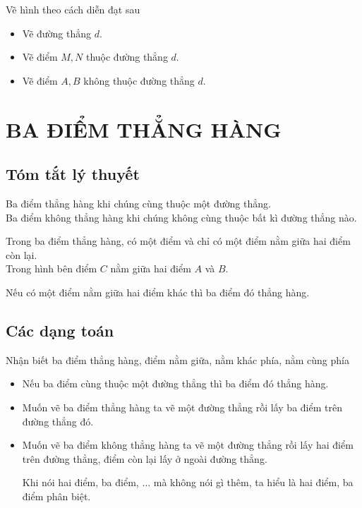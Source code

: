 \begin{bt}%
Vẽ hình theo cách diễn đạt sau
\begin{itemize}
\item Vẽ đường thẳng $d.$
\item Vẽ điểm $M, N$ thuộc đường thẳng $d.$
\item Vẽ  điểm $A, B$ không thuộc đường thẳng $d.$
\end{itemize}
\end{bt}

\section{BA ĐIỂM THẲNG HÀNG}
\subsection{Tóm tắt lý thuyết}
\begin{dn}
Ba điểm thẳng hàng khi chúng cùng thuộc một đường thẳng.\\
Ba điểm không thẳng hàng khi chúng không cùng thuộc bất kì đường thẳng nào.
\end{dn}
\begin{dl}
Trong ba điểm thẳng hàng, có một điểm và chỉ có một điểm nằm giữa hai điểm còn lại.\\
Trong hình bên điểm $C$ nằm giữa hai điểm $A$ và $B$.
\end{dl}
\begin{note}
Nếu có một điểm nằm giữa hai điểm khác thì ba điểm đó thẳng hàng.
\end{note}
\subsection{Các dạng toán}
\begin{dang}{Nhận biết ba điểm thẳng hàng, điểm nằm giữa, nằm khác phía, nằm cùng phía}
\begin{itemize}
\item Nếu ba điểm cùng thuộc một đường thẳng thì ba điểm đó thẳng hàng.
\item Muốn vẽ ba điểm thẳng hàng ta vẽ một đường thẳng rồi lấy ba điểm trên đường thẳng đó.
\item Muốn vẽ ba điểm không thẳng hàng ta vẽ một đường thẳng rồi lấy hai điểm trên đường thẳng, điểm còn lại lấy
ở ngoài đường thẳng.
\begin{note}
Khi nói hai điểm, ba điểm, $\ldots$ mà không nói gì thêm, ta hiểu là hai điểm, ba điểm phân biệt.
\end{note}
\end{itemize}
\end{dang}


